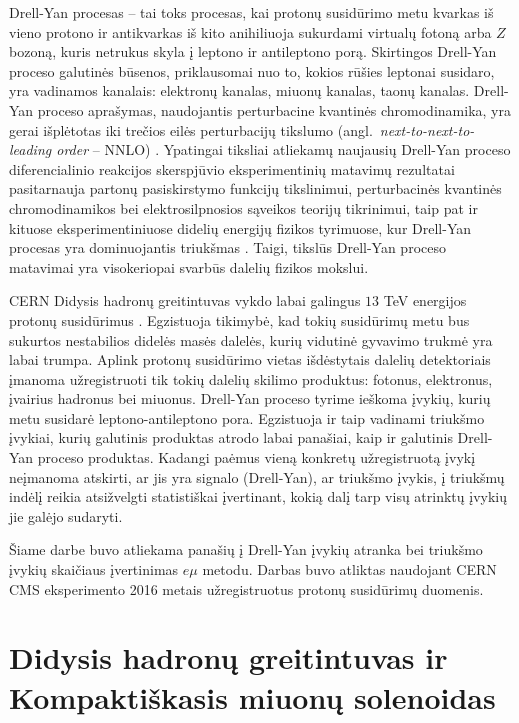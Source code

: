 \documentclass[a4paper, 12pt]{article}
\newcommand{\emu}{e\mu}
\begin{document}
Drell-Yan procesas \cite{DYoriginal} -- tai toks procesas, kai protonų susidūrimo metu kvarkas iš vieno protono ir antikvarkas
iš kito anihiliuoja sukurdami virtualų fotoną arba $Z$ bozoną, kuris netrukus skyla į leptono ir antileptono porą.
Skirtingos Drell-Yan proceso galutinės būsenos, priklausomai nuo to, kokios rūšies leptonai susidaro, yra
vadinamos kanalais: elektronų kanalas, miuonų kanalas, taonų kanalas.
Drell-Yan proceso aprašymas, naudojantis perturbacine kvantinės chromodinamika, yra gerai išplėtotas iki trečios
eilės perturbacijų tikslumo (angl.\ \textit{next-to-next-to-leading order} -- NNLO) \cite{DYNNLO}.
Ypatingai tiksliai atliekamų naujausių Drell-Yan proceso diferencialinio reakcijos skerspjūvio eksperimentinių matavimų
rezultatai pasitarnauja partonų pasiskirstymo funkcijų tikslinimui, perturbacinės kvantinės chromodinamikos bei
elektrosilpnosios sąveikos teorijų tikrinimui, taip pat ir kituose eksperimentiniuose didelių energijų fizikos
tyrimuose, kur Drell-Yan procesas yra dominuojantis triukšmas \cite{DY2018}.
Taigi, tikslūs Drell-Yan proceso matavimai yra visokeriopai svarbūs dalelių fizikos mokslui.

CERN Didysis hadronų greitintuvas vykdo labai galingus $13$ TeV energijos protonų susidūrimus \cite{DY2018}.
Egzistuoja tikimybė, kad tokių susidūrimų metu bus sukurtos nestabilios didelės masės dalelės,
kurių vidutinė gyvavimo trukmė yra labai trumpa.
Aplink protonų susidūrimo vietas išdėstytais dalelių detektoriais įmanoma užregistruoti tik tokių
dalelių skilimo produktus: fotonus, elektronus, įvairius hadronus bei miuonus.
Drell-Yan proceso tyrime ieškoma įvykių, kurių metu susidarė leptono-antileptono pora.
Egzistuoja ir taip vadinami triukšmo įvykiai, kurių galutinis produktas atrodo labai panašiai,
kaip ir galutinis Drell-Yan proceso produktas.
Kadangi paėmus vieną konkretų užregistruotą įvykį neįmanoma atskirti, ar jis yra signalo
(Drell-Yan), ar triukšmo įvykis, į triukšmų indėlį reikia atsižvelgti statistiškai įvertinant,
kokią dalį tarp visų atrinktų įvykių jie galėjo sudaryti.

Šiame darbe buvo atliekama panašių į Drell-Yan įvykių atranka bei triukšmo įvykių skaičiaus įvertinimas $\emu$ metodu.
Darbas buvo atliktas naudojant CERN CMS eksperimento 2016 metais užregistruotus protonų susidūrimų duomenis.

\section{Didysis hadronų greitintuvas ir Kompaktiškasis miuonų solenoidas}
\end{document}

